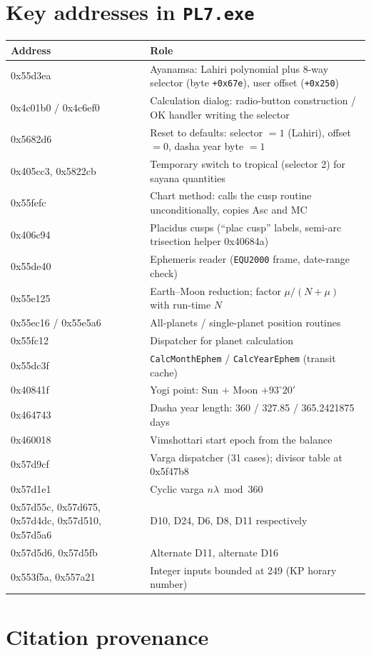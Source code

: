 \documentclass[11pt, a4paper]{article}
\DeclareRobustCommand{\_}{\textunderscore\allowbreak}
\begin{document}
\printbibliography[heading=bibintoc, title={References}]

\appendix
\section{Key addresses in \texttt{PL7.exe}}
\label{app:addresses}

\begin{longtable}{>{\raggedright\arraybackslash\ttfamily}p{4.3cm} >{\raggedright\arraybackslash}p{10.9cm}}
  \toprule
  \normalfont Address & Role \\
  \midrule
  \endhead
  0x55d3ea & Ayanamsa: Lahiri polynomial plus 8-way selector (byte \texttt{+0x67e}), user offset (\texttt{+0x250}) \\
  0x4c01b0 / 0x4c6ef0 & Calculation dialog: radio-button construction / OK handler writing the selector \\
  0x5682d6 & Reset to defaults: selector $=1$ (Lahiri), offset $=0$, dasha year byte $=1$ \\
  0x405cc3, 0x5822cb & Temporary switch to tropical (selector 2) for sayana quantities \\
  0x55fefc & Chart method: calls the cusp routine unconditionally, copies Asc and MC \\
  0x406c94 & Placidus cusps (``plac cusp'' labels, semi-arc trisection helper 0x40684a) \\
  0x55de40 & Ephemeris reader (\texttt{EQU2000} frame, date-range check) \\
  0x55e125 & Earth--Moon reduction; factor $\mu/(N+\mu)$ with run-time $N$ \\
  0x55ec16 / 0x55e5a6 & All-planets / single-planet position routines \\
  0x55fc12 & Dispatcher for planet calculation \\
  0x55dc3f & \texttt{CalcMonthEphem} / \texttt{CalcYearEphem} (transit cache) \\
  0x40841f & Yogi point: Sun $+$ Moon $+ 93^\circ 20'$ \\
  0x464743 & Dasha year length: 360 / 327.85 / 365.2421875 days \\
  0x460018 & Vimshottari start epoch from the balance \\
  0x57d9cf & Varga dispatcher (31 cases); divisor table at 0x5f47b8 \\
  0x57d1e1 & Cyclic varga $n\lambda \bmod 360$ \\
  0x57d55c, 0x57d675, 0x57d4dc, 0x57d510, 0x57d5a6 & D10, D24, D6, D8, D11 respectively \\
  0x57d5d6, 0x57d5fb & Alternate D11, alternate D16 \\
  0x553f5a, 0x557a21 & Integer inputs bounded at 249 (KP horary number) \\
  \bottomrule
\end{longtable}

\section{Citation provenance}
\label{app:provenance}

{\setlength{\tabcolsep}{4pt}}
\end{document}
